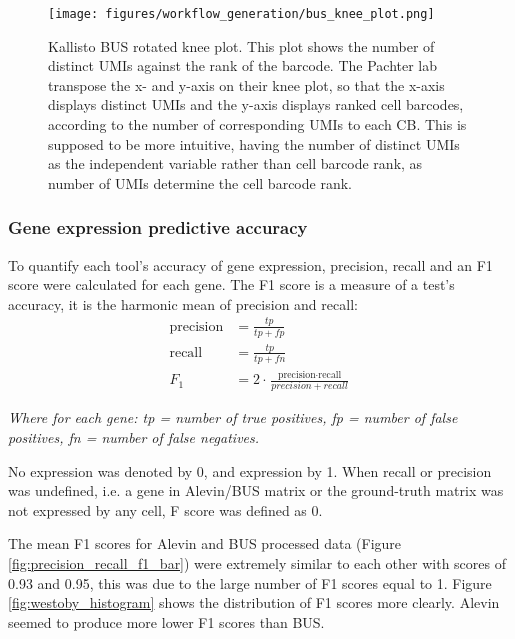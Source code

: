\begin{figure}[htb]
    \centering
    \texttt{[image: figures/workflow\_generation/bus\_knee\_plot.png]}
    \caption[Benchmark Kallisto Bus Rotated Knee Plot]{Kallisto BUS rotated knee plot.
    This plot shows the number of distinct UMIs against the rank of the barcode.
    The Pachter lab transpose the x- and y-axis on their knee plot, so that the x-axis displays distinct UMIs and the y-axis displays ranked cell barcodes, according to the number of corresponding UMIs to each CB. This is supposed to be more intuitive, having the number of distinct UMIs as the independent variable rather than cell barcode rank, as number of UMIs determine the cell barcode rank.}
    \label{fig:bus_knee}
\end{figure}

\subsubsection{Gene expression predictive accuracy}
To quantify each tool's accuracy of gene expression, precision, recall and an F1 score were calculated for each gene.
The F1 score is a measure of a test's accuracy, it is the harmonic mean of precision and recall:
\begin{equation}
\begin{aligned}
\text{precision} & = \frac{tp}{tp + fp}\\
%
\text{recall} & = \frac{tp}{tp + fn}\\
%
F_{1} & = 2 \cdot \frac{\text{precision} \cdot \text{recall}}{precision + recall}
\end{aligned}
\end{equation}

\textit{Where for each gene: tp = number of true positives, fp = number of false positives, fn = number of false negatives.}


No expression was denoted by 0, and expression by 1.
When recall or precision was undefined, i.e. a gene in Alevin/BUS matrix or the ground-truth matrix was not expressed by any cell, F score was defined as 0.

The mean F1 scores for Alevin and BUS processed data (Figure \ref{fig:precision_recall_f1_bar}) were extremely similar to each other with scores of 0.93 and 0.95, this was due to the large number of F1 scores equal to 1.
Figure \ref{fig:westoby_histogram} shows the distribution of F1 scores more clearly.
Alevin seemed to produce more lower F1 scores than BUS.

